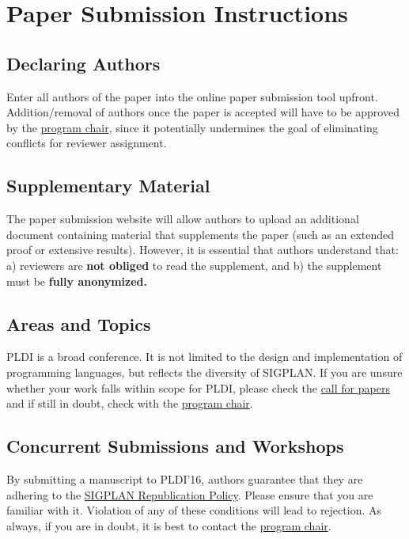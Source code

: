 \documentclass[pldi]{sigplanconf-pldi16}
\begin{document}
\section{Paper Submission Instructions}

\subsection{Declaring Authors}

Enter all authors of the paper into the online paper submission tool
upfront. Addition/removal of authors once the paper is accepted will
have to be approved by the \href{mailto:emery@cs.umass.edu?subject=[PLDI'16]}{program chair}, since it potentially
undermines the goal of eliminating conflicts for reviewer assignment.

\subsection{Supplementary Material}

The paper submission website will allow authors to upload an
additional document containing material that supplements the paper
(such as an extended proof or extensive results).  However, it is
essential that authors understand that: a) reviewers are \textbf{not
  obliged} to read the supplement, and b) the supplement must
  be \textbf{fully anonymized.}

\subsection{Areas and Topics}

PLDI is a broad conference.  It is not limited to the design and
implementation of programming languages, but reflects the diversity of
SIGPLAN.  If you are unsure whether your work falls
within scope for PLDI, please check the
\href{http://conf.researchr.org/track/pldi2016/pldi2016-papers#Call-for-Papers}{call
  for papers} and if still in doubt, check with the
\href{mailto:emery@cs.umass.edu?subject=[PLDI'16]}{program
  chair}.

\subsection{Concurrent Submissions and Workshops}

By submitting a manuscript to PLDI'16, authors guarantee that they
are adhering to the
\href{http://www.sigplan.org/Resources/Policies/Republication/}{SIGPLAN
  Republication Policy}. Please ensure that you are familiar with it.
Violation of any of these conditions will lead to rejection.
As always, if you are in doubt, it is best to contact the
\href{mailto:emery@cs.umass.edu?subject=[PLDI'16]}{program
  chair}.
\end{document}
